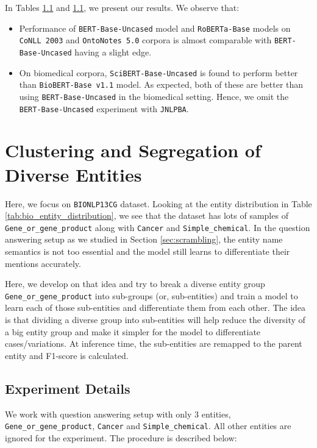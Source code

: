 In Tables \ref{} and \ref{}, we present our results. We observe that:

\begin{itemize}
    \item Performance of \texttt{BERT-Base-Uncased} model and \texttt{RoBERTa-Base} models on \texttt{CoNLL 2003} and \texttt{OntoNotes 5.0} corpora is almost comparable with \texttt{BERT-Base-Uncased} having a slight edge.
    
    \item On biomedical corpora, \texttt{SciBERT-Base-Uncased} is found to perform better than \texttt{BioBERT-Base v1.1} model. As expected, both of these are better than using \texttt{BERT-Base-Uncased} in the biomedical setting. Hence, we omit the \texttt{BERT-Base-Uncased} experiment with \texttt{JNLPBA}.
\end{itemize}

\section{Clustering and Segregation of Diverse Entities}
Here, we focus on \texttt{BIONLP13CG} dataset. Looking at the entity distribution in Table \ref{tab:bio_entity_distribution}, we see that the dataset has lots of samples of \texttt{Gene\_or\_gene\_product} along with \texttt{Cancer} and \texttt{Simple\_chemical}. In the question answering setup as we studied in Section \ref{sec:scrambling}, the entity name semantics is not too essential and the model still learns to differentiate their mentions accurately. 

Here, we develop on that idea and try to break a diverse entity group \texttt{Gene\_or\_gene\_product} into sub-groups (or, sub-entities) and train a model to learn each of those sub-entities and differentiate them from each other. The idea is that dividing a diverse group into sub-entities will help reduce the diversity of a big entity group and make it simpler for the model to differentiate cases/variations. At inference time, the sub-entities are remapped to the parent entity and F1-score is calculated.

\subsection{Experiment Details}
We work with question answering setup with only 3 entities, \texttt{Gene\_or\_gene\_product}, \texttt{Cancer} and \texttt{Simple\_chemical}. All other entities are ignored for the experiment. The procedure is described below:

